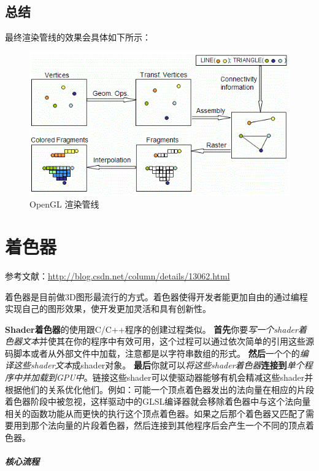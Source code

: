 \documentclass[UTF8,a4paper,12pt]{ctexbook}
\begin{document}
				
		\subsection{总结}
			最终渲染管线的效果会具体如下所示：
			\begin{figure}[h]
				\centering
				\includegraphics[width=.9\linewidth]{OpenGLPipeline1.png}
				\caption{OpenGL 渲染管线}
			\end{figure}		
		
		

	\section{着色器}
		参考文献：\url{http://blog.csdn.net/column/details/13062.html}
		
		着色器是目前做3D图形最流行的方式。着色器使得开发者能更加自由的通过编程实现自己的图形效果，使开发更加灵活和具有创新性。
			
		\textbf{Shader着色器}的使用跟C/C++程序的创建过程类似。
		\textbf{首先}你要\textit{写一个shader着色器文本}并使其在你的程序中有效可用，这个过程可以通过依次简单的引用这些源码脚本或者从外部文件中加载，注意都是以字符串数组的形式。
		\textbf{然后}一个个的\textit{编译这些shader文本}成shader对象。
		\textbf{最后}你就可以\textit{将这些shader着色器}\textbf{连接到}\textit{单个程序中并加载到GPU中}。链接这些shader可以使驱动器能够有机会精减这些shader并根据他们的关系优化他们。例如：可能一个顶点着色器发出的法向量在相应的片段着色器阶段中被忽视，这样驱动中的GLSL编译器就会移除着色器中与这个法向量相关的函数功能从而更快的执行这个顶点着色器。如果之后那个着色器又匹配了需要用到那个法向量的片段着色器，然后连接到其他程序后会产生一个不同的顶点着色器。  

		\subparagraph{核心流程}
		
\end{document}

